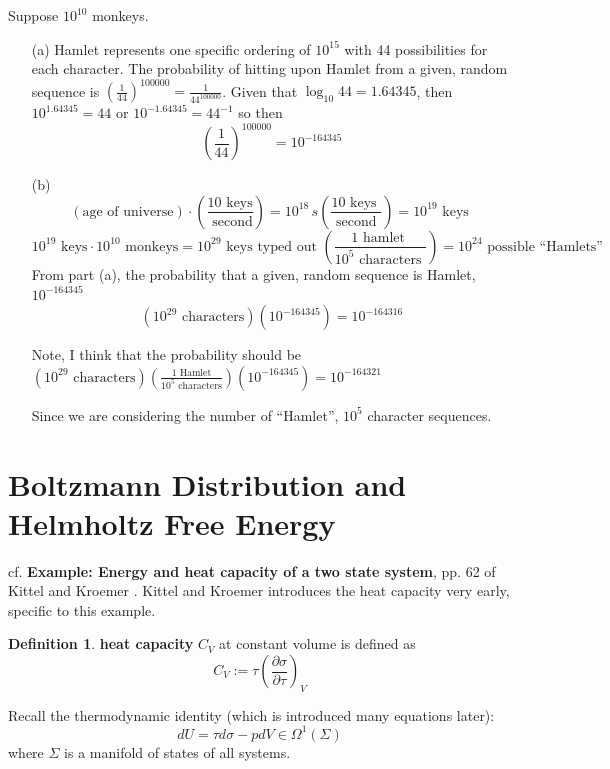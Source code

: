 \documentclass[twoside]{amsart}
\theoremstyle{plain}
\theoremstyle{definition}
\newtheorem{definition}{Definition}
\begin{document}
Suppose $10^{10}$ monkeys.  
\begin{itemize}
\item[(a)] Hamlet represents one specific ordering of $10^{15}$ with 44 possibilities for each character.  The probability of hitting upon Hamlet from a given, random sequence is $\left( \frac{1}{44} \right)^{100000} = \boxed{ \frac{1}{44^{100000}} }$.  Given that $\log_{10}{44} = 1.64345$, then $10^{1.64345} = 44$ or $10^{-1.64345} = 44^{-1}$ so then 
\[
\left( \frac{1}{44} \right)^{100000} = 10^{-164345}
\]
\item[(b)] 
\[
(\text{age of universe})\cdot \left( \frac{ 10 \text{ keys} }{ \text{ second} } \right) = 10^{18} \, s \left( \frac{ 10 \text{ keys }}{ \text{ second } } \right) = 10^{19} \text{ keys }
\]
\[
10^{19} \text{ keys} \cdot 10^{10} \text{ monkeys} = 10^{29} \text{ keys typed out } \left( \frac{ 1 \text{ hamlet } }{ 10^5 \text{ characters } } \right) = 10^{24} \text{ possible ``Hamlets'' }
\]
From part (a), the probability that a given, random sequence is Hamlet, $10^{-164345}$
\[
(10^{29} \text{ characters})( 10^{-164345}) =  10^{-164316} 
\]

Note, I think that the probability should be $(10^{29} \text{ characters})\left( \frac{ 1 \text{ Hamlet}}{ 10^5 \text{ characters} } \right)(10^{-164345} ) = 10^{-164321}$

Since we are considering the number of ``Hamlet'', $10^5$ character sequences.  
\end{itemize}


\section{Boltzmann Distribution and Helmholtz Free Energy}

cf. \textbf{Example: Energy and heat capacity of a two state system}, pp. 62 of Kittel and Kroemer \cite{CKittelHKroemer1980}.  Kittel and Kroemer introduces the heat capacity very early, specific to this example.  

\begin{definition}
\textbf{heat capacity} $C_V$ at constant volume is defined as 
\begin{equation}
  C_V := \tau \left( \frac{ \partial \sigma }{ \partial \tau} \right)_V
\end{equation}
\end{definition}

Recall the thermodynamic identity (which is introduced many equations later): 
\[
dU = \tau d\sigma - pdV \in \Omega^1(\Sigma)
\]
where $\Sigma$ is a manifold of states of all systems.
\end{document}
